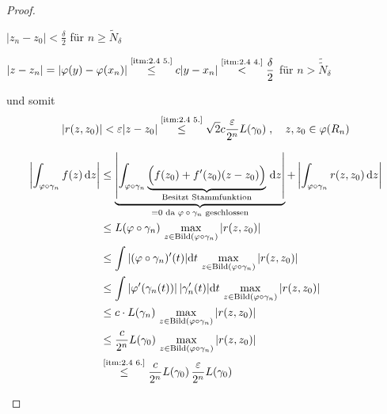 \documentclass[a4paper,10pt]{scrbook}
\begin{document}
\begin{theorem}
\begin{proof}
\begin{enum-arab}
      \begin{notice*}
        $\displaystyle |z_n - z_0| < \frac{\delta}{2}$ für $n \geq \widetilde{N}_\delta$

        $\displaystyle |z-z_n| = |\varphi(y)-\varphi(x_n)| \overset{\text{\ref{itm:2.4 5.}}}{\leq} c |y - x_n| \overset{\text{\ref{itm:2.4 4.}}}{<} \frac{\delta}{2}$ für $n > \widetilde{\widetilde{N}}_\delta$
      \end{notice*}

      und somit
      \begin{align*}
        |r(z,z_0)| < \varepsilon |z-z_0| \overset{\text{\ref{itm:2.4 5.}}}{\leq} \sqrt{2} c \frac{\varepsilon}{2^n} L(\gamma_0) \; , \quad z,z_0 \in \varphi(R_n)
      \end{align*}

      \item
      \begin{gather*}
        \begin{aligned}
          \left| \int_{\varphi \circ \gamma_n} f(z) \, \mathrm{d}z \right|
          &\leq \underbrace{\left| \int_{\varphi \circ \gamma_n} \underbrace{\Big(f(z_0) + f'(z_0) (z-z_0)\Big)}_{\text{Besitzt Stammfunktion}} \, \mathrm{d}z \right|}_{=0 \text{ da $\varphi \circ \gamma_n$ geschlossen}}
          + \left| \int_{\varphi \circ \gamma_n} r(z,z_0) \, \mathrm{d}z \right| \\
          &\leq L(\varphi \circ \gamma_n)
          \, \max\limits_{z \in \mathrm{Bild}(\varphi \circ \gamma_n)} |r(z,z_0)| \\
          &\leq \int |(\varphi \circ \gamma_n)'(t)| \mathrm{d}t
          \, \max\limits_{z \in \mathrm{Bild}(\varphi \circ \gamma_n)} |r(z,z_0)| \\
          &\leq \int |\varphi'(\gamma_n(t))| \, |\gamma_n'(t)| \mathrm{d}t
          \, \max\limits_{z \in \mathrm{Bild}(\varphi \circ \gamma_n)} |r(z,z_0)| \\
          &\leq c \cdot L(\gamma_n)
          \, \max\limits_{z \in \mathrm{Bild}(\varphi \circ \gamma_n)} |r(z,z_0)| \\
          &\leq \frac{c}{2^n} L(\gamma_0)
          \, \max\limits_{z \in \mathrm{Bild}(\varphi \circ \gamma_n)} |r(z,z_0)| \\
          &\overset{\text{\ref{itm:2.4 6.}}}{\leq} \frac{c}{2^n} L(\gamma_0) \, \frac{\varepsilon}{2^n} L(\gamma_0) \\
        \end{aligned} \\

\end{gather*}
\end{enum-arab}
\end{proof}
\end{theorem}
\end{document}
